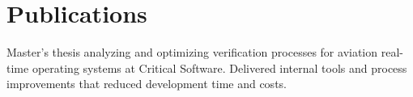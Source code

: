 \documentclass[letterpaper]{twentysecondcv} %
\begin{document}
\section{Publications}

\begin{twenty}
    {}
    {Master's thesis analyzing and optimizing verification processes for aviation
    real-time operating systems at Critical Software. Delivered internal tools and
    process improvements that reduced development time and costs.}
\end{twenty}


\vfill
\end{document}
